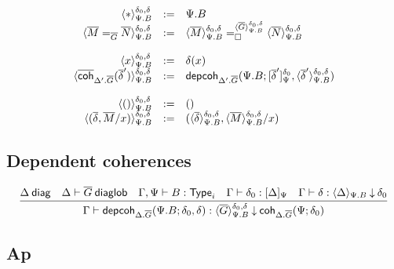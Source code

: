 \[
  \begin{array}{rcl}
    \interpdepglob{\diagbase}{\Psi.B}{\delta_0}{\delta} & := & \Psi.B \\
    \interpdepglob{\homj{\diag G}{\diag M}{\diag N}}{\Psi.B}{\delta_0}{\delta} & := &
    \dhomj
      {\interpdepglob{\diag G}{\Psi.B}{\delta_0}{\delta}}
      {\interpdepglob{\diag M}{\Psi.B}{\delta_0}{\delta}}
      {\interpdepglob{\diag N}{\Psi.B}{\delta_0}{\delta}}
      {\blank}
    \\\\

    \interpdepglob{x}{\Psi.B}{\delta_0}{\delta} & := & \delta(x) \\
    \interpdepglob
      {\diagcoh{\Delta'.\diag{G}}{\diag \delta'}}{\Psi.B}{\delta_0}{\delta} & := &
    \depcoh{\Delta'.\diag G}{\Psi.B}
      {\interpglob{\diag\delta'}{\Psi}{\delta_0}}
      {\interpdepglob{\diag\delta'}{\Psi.B}{\delta_0}{\delta}} \\\\

    \interpdepglob{()}{\Psi.B}{\delta_0}{\delta} & := & () \\
    \interpdepglob{(\diag \delta,\diag M/x)}{\Psi.B}{\delta_0}{\delta} & := &
    (\interpdepglob{\diag\delta}{\Psi.B}{\delta_0}{\delta},\interpdepglob{\diag
    M}{\Psi.B}{\delta_0}{\delta}/x)
  \end{array}
\]

\subsection{Dependent coherences}

\begin{small}
\[
\infer
  {\ofdepglob{\Gamma}{\depcoh{\Delta.\diag G}{\Psi.B}{\delta_0}{\delta}}
    {\interpdepglob{\diag G}{\Psi.B}{\delta_0}{\delta}}{\coh{\Delta.\diag
    G}{\Psi}{\delta_0}}}
  {\wfdiag{\Delta}
  &\wfdiaglob{\Delta}{\diag G}
  &\wftype{\Gamma,\Psi}{B}
  &\ofinterp{\Gamma}{\delta_0}{\Delta}{\Psi}
  &\ofinterpdep{\Gamma}{\delta}{\Delta}{\Psi.B}{\delta_0}}
\]
\end{small}

\subsection{Ap}


